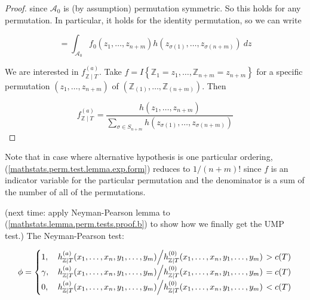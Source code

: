 \begin{proof}
since \(\mathcal{A}_0\) is (by assumption) permutation symmetric. So this holds for any permutation. In particular, it holds for the identity permutation, so we can write

\[
=     \int_{\mathcal{A}_0} f_0(z_{1}, \ldots, z_{n+m}) h(z_{\sigma(1)}, \ldots, z_{\sigma(n+m)}) \ dz 
\]

We are interested in \(f_{\mathbb{Z} \mid T} ^{(a)}\). Take \(f = I \left\{ \mathbb{Z}_1 = z_1, \ldots, \mathbb{Z}_{n+m} = z_{n+m}\right\}\) for a specific permutation \((z_1, \ldots, z_{n+m})\) of \((\mathbb{Z}_{(1)}, \ldots, \mathbb{Z}_{(n+m)})\). Then 

\begin{equation}\label{mathstats.lemma.perm.tests.proof.b}
f_{\mathbb{Z} \mid T} ^{(a)} = \frac{h(z_1, \ldots, z_{n+m})}
{\sum_{\sigma \in S_{n+m}} h(z_{\sigma(1)}, \ldots, z_{\sigma(n+m)})}
\end{equation}

\end{proof}

\begin{remark}

Note that in case where alternative hypothesis is one particular ordering, (\ref{mathstats.perm.test.lemma.exp.form}) reduces to \(1/(n+m)!\) since \(f\) is an indicator variable for the particular permutation and the denominator is a sum of the number of all of the permutations.

\end{remark}

(next time: apply Neyman-Pearson lemma to (\ref{mathstats.lemma.perm.tests.proof.b}) to show how we finally get the UMP test.) The Neyman-Pearson test:

\begin{equation}\label{mathstats.lemma.perm.tests.test.a}
\phi = \begin{cases}
1, &  \left. h_{\mathbb{Z} \mid T} ^{(a)}(x_1, \ldots, x_n, y_1, \ldots, y_m) \middle/  h_{\mathbb{Z} \mid T} ^{(0)}(x_1, \ldots, x_n, y_1, \ldots, y_m)  \right. > c(T)   \\
\gamma, & \left. h_{\mathbb{Z} \mid T} ^{(a)}(x_1, \ldots, x_n, y_1, \ldots, y_m) \middle/  h_{\mathbb{Z} \mid T} ^{(0)}(x_1, \ldots, x_n, y_1, \ldots, y_m)  \right. = c(T) \\
0, &  \left. h_{\mathbb{Z} \mid T} ^{(a)}(x_1, \ldots, x_n, y_1, \ldots, y_m) \middle/  h_{\mathbb{Z} \mid T} ^{(0)}(x_1, \ldots, x_n, y_1, \ldots, y_m)  \right. < c(T) 
\end{cases}
\end{equation}

